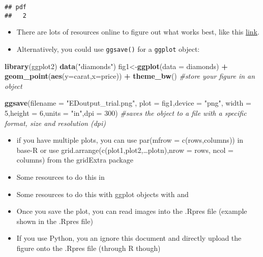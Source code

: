 \documentclass[]{article}
\newenvironment{Shaded}{\begin{snugshade}}{\end{snugshade}}
\newcommand{\CommentTok}[1]{\textcolor[rgb]{0.56,0.35,0.01}{\textit{#1}}}
\newcommand{\DataTypeTok}[1]{\textcolor[rgb]{0.13,0.29,0.53}{#1}}
\newcommand{\DecValTok}[1]{\textcolor[rgb]{0.00,0.00,0.81}{#1}}
\newcommand{\KeywordTok}[1]{\textcolor[rgb]{0.13,0.29,0.53}{\textbf{#1}}}
\newcommand{\NormalTok}[1]{#1}
\newcommand{\OperatorTok}[1]{\textcolor[rgb]{0.81,0.36,0.00}{\textbf{#1}}}
\newcommand{\StringTok}[1]{\textcolor[rgb]{0.31,0.60,0.02}{#1}}
\providecommand{\tightlist}{%
  \setlength{\itemsep}{0pt}\setlength{\parskip}{0pt}}
\begin{document}
\begin{verbatim}
## pdf 
##   2
\end{verbatim}

\begin{itemize}
\item
  There are lots of resources online to figure out what works best, like
  this
  \href{'https://www.datamentor.io/r-programming/saving-plot/'}{link}.
\item
  Alternatively, you could use \texttt{ggsave()} for a \texttt{ggplot}
  object:
\end{itemize}

\begin{Shaded}
\begin{Highlighting}[]
\KeywordTok{library}\NormalTok{(ggplot2)}
\KeywordTok{data}\NormalTok{(}\StringTok{"diamonds"}\NormalTok{)}
\NormalTok{fig1<-}\KeywordTok{ggplot}\NormalTok{(}\DataTypeTok{data =}\NormalTok{ diamonds) }\OperatorTok{+}\StringTok{ }\KeywordTok{geom_point}\NormalTok{(}\KeywordTok{aes}\NormalTok{(}\DataTypeTok{y=}\NormalTok{carat,}\DataTypeTok{x=}\NormalTok{price)) }\OperatorTok{+}\StringTok{ }\KeywordTok{theme_bw}\NormalTok{() }\CommentTok{#store your figure in an object}

\KeywordTok{ggsave}\NormalTok{(}\DataTypeTok{filename =} \StringTok{"EDoutput_trial.png"}\NormalTok{,}
       \DataTypeTok{plot =}\NormalTok{ fig1,}\DataTypeTok{device =} \StringTok{"png"}\NormalTok{,}
       \DataTypeTok{width =} \DecValTok{5}\NormalTok{,}\DataTypeTok{height =} \DecValTok{6}\NormalTok{,}\DataTypeTok{units =} \StringTok{"in"}\NormalTok{,}\DataTypeTok{dpi =} \DecValTok{300}\NormalTok{) }\CommentTok{#saves the object to a file with a specific format, size and resolution (dpi)}
\end{Highlighting}
\end{Shaded}

\begin{itemize}
\tightlist
\item
  if you have multiple plots, you can use par(mfrow = c(rows,columns))
  in base-R or use grid.arrange(c(plot1,plot2,\ldots plotn),nrow = rows,
  ncol = columns) from the gridExtra package
\item
  Some resources to do this in \href{base-R}{}
\item
  Some resources to do this with ggplot objects with
  \href{\%60gridExtra\%60}{} and \href{\%60cowPlot\%60}{}
\item
  Once you save the plot, you can read images into the .Rpres file
  (example shown in the .Rpres file)
\item
  If you use Python, you an ignore this document and directly upload the
  figure onto the .Rpres file (through R though)
\end{itemize}
\end{document}
